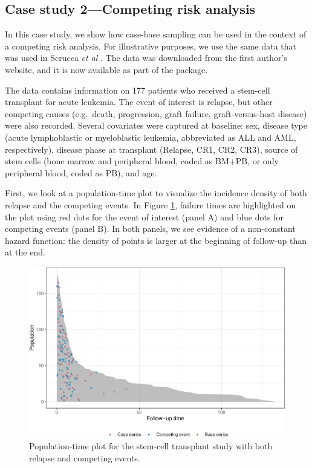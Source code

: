 \hypertarget{case-study-2competing-risk-analysis}{%
\subsection{Case study 2---Competing risk
analysis}\label{case-study-2competing-risk-analysis}}

In this case study, we show how case-base sampling can be used in the
context of a competing risk analysis. For illustrative purposes, we use
the same data that was used in Scrucca \emph{et al}
\citeyearpar{scrucca2010regression}. The data was downloaded from the
first author's website, and it is now available as part of the
 package.

The data contains information on 177 patients who received a stem-cell
transplant for acute leukemia. The event of interest is relapse, but
other competing causes (e.g.~death, progression, graft failure,
graft-versus-host disease) were also recorded. Several covariates were
captured at baseline: sex, disease type (acute lymphoblastic or
myeloblastic leukemia, abbreviated as ALL and AML, respectively),
disease phase at transplant (Relapse, CR1, CR2, CR3), source of stem
cells (bone marrow and peripheral blood, coded as BM+PB, or only
peripheral blood, coded as PB), and age.

First, we look at a population-time plot to visualize the incidence
density of both relapse and the competing events. In Figure
\ref{fig:compPop}, failure times are highlighted on the plot using red
dots for the event of interest (panel A) and blue dots for competing
events (panel B). In both panels, we see evidence of a non-constant
hazard function: the density of points is larger at the beginning of
follow-up than at the end.

\begin{Schunk}
\begin{figure}[ht]
\includegraphics[width=\textwidth,keepaspectratio=true]{./compPop-1} \caption[Population-time plot for the stem-cell transplant study with both relapse and competing events]{Population-time plot for the stem-cell transplant study with both relapse and competing events.}\label{fig:compPop}
\end{figure}
\end{Schunk}

